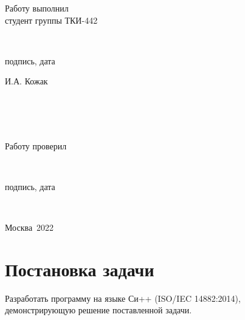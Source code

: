 \documentclass[a4paper,12pt]{article}
\begin{document}
\begin{titlepage}
\begin{flushright}
\begin{minipage}[center]{15cm}
    \begin{minipage}[left]{5cm}
      {Работу выполнил\\студент группы ТКИ-442}
    \end{minipage}
    \begin{minipage}[center]{5cm}
      \vspace{1.25cm}
      \hrulefill\\[-1cm]
      \begin{center}{подпись, дата}\end{center}
    \end{minipage}
    \begin{minipage}[right]{4cm}
      \vspace{0.4cm}
      \begin{flushright}{И.А. Кожак}\end{flushright}
    \end{minipage}
    \\
    \\
    \\
    \begin{minipage}[left]{5cm}
      {Работу проверил}
    \end{minipage}
    \begin{minipage}[center]{5cm}
      \vspace{1.25cm}
      \hrulefill\\[-1cm]
      \begin{center}{подпись, дата}\end{center}
    \end{minipage}
    \begin{minipage}[right]{4cm}
      \vspace{1.25cm}
      \hrulefill\\[-0.92cm]
      \begin{center}{}\end{center}
    \end{minipage}
  \end{minipage}
\end{flushright}

\vspace{\fill}

\begin{center}
Москва~2022
\end{center}
\end{titlepage}
\setcounter{page}{2}


\tableofcontents
\cleardoublepage


\section*{Постановка задачи}
Разработать программу на языке Си++ (ISO/IEC 14882:2014), демонстрирующую решение поставленной задачи.
\end{document}

